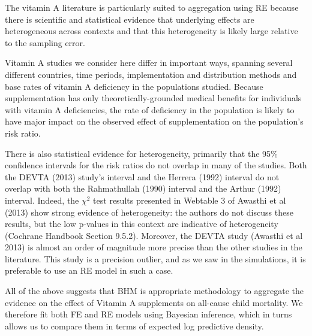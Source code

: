 \documentclass[12pt]{article}
\begin{document}
The vitamin A literature is particularly suited to aggregation using RE because there is scientific and statistical evidence that underlying effects are heterogeneous across contexts and that this heterogeneity is likely large relative to the sampling error. 

Vitamin A studies we consider here differ in important ways, spanning several different countries, time periods, implementation and distribution methods and base rates of vitamin A deficiency in the populations studied. Because supplementation has only theoretically-grounded medical benefits for individuals with vitamin A deficiencies, the rate of deficiency in the population is likely to have major impact on the observed effect of supplementation on the population's risk ratio. 

There is also statistical evidence for heterogeneity, primarily that the 95\% confidence intervals for the risk ratios do not overlap in many of the studies. Both the DEVTA (2013) study's interval and the Herrera (1992) interval do not overlap with both the Rahmathullah (1990) interval and the Arthur (1992) interval. Indeed, the $\chi^2$ test results presented in Webtable 3 of Awasthi et al (2013) show strong evidence of heterogeneity: the authors do not discuss these results, but the low p-values in this context are indicative of heterogeneity (Cochrane Handbook Section 9.5.2). Moreover, the DEVTA study (Awasthi et al 2013) is almost an order of magnitude more precise than the other studies in the literature. This study is a precision outlier, and as we saw in the simulations, it is preferable to use an RE model in such a case.

All of the above suggests that BHM is appropriate methodology to aggregate the evidence on the effect of Vitamin A supplements on all-cause child mortality. We therefore fit both FE and RE models using Bayesian inference, which in turns allows us to compare them in terms of expected log predictive density.




\end{document}
